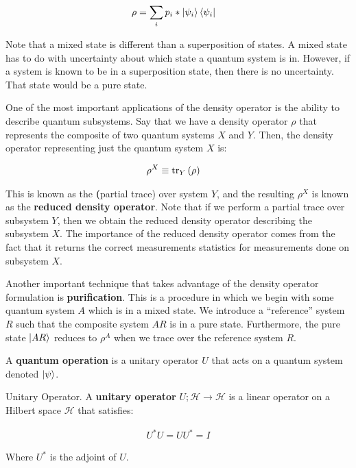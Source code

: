 \begin{align}
    \rho &= \sum_{i} p_i * \ket{\psi_i}\bra{\psi_i}
\end{align}

Note that a mixed state is different than a superposition of states. A mixed state has to do with uncertainty about which state a quantum system is in. However, if a system is known to be in a superposition state, then there is no uncertainty. That state would be a pure state.

One of the most important applications of the density operator is the ability to describe quantum subsystems. Say that we have a density operator $\rho$ that represents the composite of two quantum systems $X$ and $Y$. Then, the density operator representing just the quantum system $X$ is:

\begin{align}
    \rho^X &\equiv \trace[Y]{\rho}
\end{align}

This is known as the \textbf(partial trace) over system $Y$, and the resulting $\rho^X$ is known as the \textbf{reduced density operator}. Note that if we perform a partial trace over subsystem $Y$, then we obtain the reduced density operator describing the subsystem $X$. The importance of the reduced density operator comes from the fact that it returns the correct measurements statistics for measurements done on subsystem $X$.

Another important technique that takes advantage of the density operator formulation is \textbf{purification}. This is a procedure in which we begin with some quantum system $A$ which is in a mixed state. We introduce a ``reference'' system $R$ such that the composite system $AR$ is in a pure state. Furthermore, the pure state $\ket{AR}$ reduces to $\rho^A$ when we trace over the reference system $R$.

A \textbf{quantum operation} is a unitary operator $U$ that acts on a quantum system denoted $\ket{\psi}$.

\begin{definition}{Unitary Operator.}
    A \textbf{unitary operator} $U;\mathcal{H} \to \mathcal{H}$ is a linear operator on a Hilbert space $\mathcal{H}$ that satisfies:
    
    \begin{align}
        U^*U = UU^* = I
    \end{align}
    
    Where $U^*$ is the adjoint of $U$.
\end{definition}

